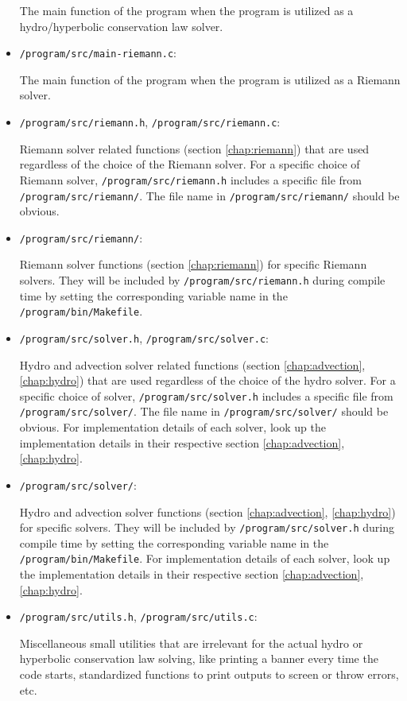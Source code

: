 \begin{itemize}
			The main function of the program when the program is utilized as a hydro/hyperbolic conservation law solver.
			
	\item 	\verb|/program/src/main-riemann.c|:
			
			The main function of the program when the program is utilized as a Riemann solver.
			
			
	\item 	\verb|/program/src/riemann.h|, \verb|/program/src/riemann.c|:
	
			Riemann solver related functions (section \ref{chap:riemann}) that are used regardless of the choice of the Riemann solver.
			For a specific choice of Riemann solver, \verb|/program/src/riemann.h| includes a specific file from \verb|/program/src/riemann/|.
			The file name in \verb|/program/src/riemann/| should be obvious.
			
	\item 	\verb|/program/src/riemann/|:
	
			Riemann solver functions (section \ref{chap:riemann}) for specific Riemann solvers.
			They will be included by \verb|/program/src/riemann.h| during compile time by setting the corresponding variable name in the \verb|/program/bin/Makefile|.

	\item 	\verb|/program/src/solver.h|, \verb|/program/src/solver.c|:
	
			Hydro and advection solver related functions (section \ref{chap:advection}, \ref{chap:hydro}) that are used regardless of the choice of the hydro solver.
			For a specific choice of solver, \verb|/program/src/solver.h| includes a specific file from \verb|/program/src/solver/|.
			The file name in \verb|/program/src/solver/| should be obvious.
			For implementation details of each solver, look up the implementation details in their respective section \ref{chap:advection}, \ref{chap:hydro}.
			
	\item 	\verb|/program/src/solver/|:
	
			Hydro and advection solver functions (section \ref{chap:advection}, \ref{chap:hydro}) for specific  solvers.
			They will be included by \verb|/program/src/solver.h| during compile time by setting the corresponding variable name in the \verb|/program/bin/Makefile|.
			For implementation details of each solver, look up the implementation details in their respective section \ref{chap:advection}, \ref{chap:hydro}.

	\item 	\verb|/program/src/utils.h|, \verb|/program/src/utils.c|:
	
			Miscellaneous small utilities that are irrelevant for the actual hydro or hyperbolic conservation law solving, like printing a banner every time the code starts, standardized functions to print outputs to screen or throw errors, etc.

\end{itemize}

	





